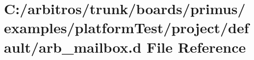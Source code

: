 \hypertarget{boards_2primus_2examples_2platform_test_2project_2default_2arb__mailbox_8d}{\section{C\-:/arbitros/trunk/boards/primus/examples/platform\-Test/project/default/arb\-\_\-mailbox.d File Reference}
\label{boards_2primus_2examples_2platform_test_2project_2default_2arb__mailbox_8d}
}
